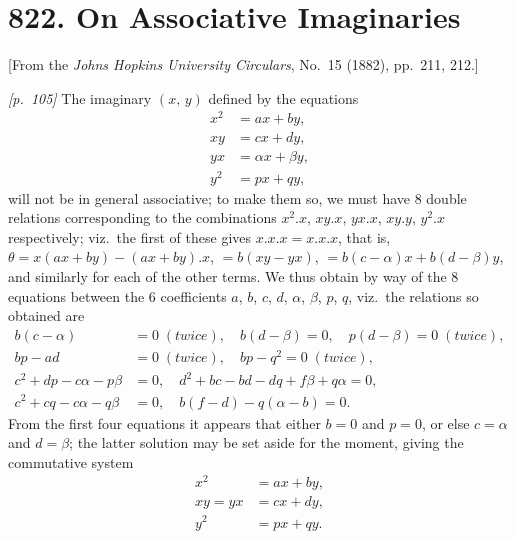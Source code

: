 \documentclass[11pt,a4paper]{article}
\theoremstyle{plain}
\theoremstyle{definition}
\theoremstyle{remark}
\begin{document}
\section*{822. On Associative Imaginaries}

\begin{center}
\small[From the \textit{Johns Hopkins University Circulars}, No.~15 (1882), pp.~211, 212.]
\end{center}

\bigskip

\noindent\textit{[p.~105]} The imaginary $(x,\,y)$ defined by the equations
\begin{align*}
x^2 &= ax + by,\\
xy &= cx + dy,\\
yx &= \alpha x + \beta y,\\
y^2 &= px + qy,
\end{align*}
will not be in general associative; to make them so, we must have 8 double relations corresponding to the combinations $x^2.x$, $xy.x$, $yx.x$, $xy.y$, $y^2.x$ respectively; viz.\ the first of these gives $x.x.x = x.x.x$, that is, $\theta = x(ax + by) - (ax + by).x$, $= b(xy - yx)$, $= b(c - \alpha) x + b(d - \beta) y$, and similarly for each of the other terms. We thus obtain by way of the 8 equations between the 6 coefficients $a$, $b$, $c$, $d$, $\alpha$, $\beta$, $p$, $q$, viz.\ the relations so obtained are
\begin{align*}
b(c - \alpha) &= 0\;(twice),\quad b(d - \beta) = 0,\quad p(d - \beta) = 0\;(twice),\\
bp - ad &= 0\;(twice),\quad bp - q^2 = 0\;(twice),\\
c^2 + dp - c\alpha - p\beta &= 0,\quad d^2 + bc - bd - dq + f\beta + q\alpha = 0,\\
c^2 + cq - c\alpha - q\beta &= 0,\quad b(f - d) - q(\alpha - b) = 0.
\end{align*}
From the first four equations it appears that either $b = 0$ and $p = 0$, or else $c = \alpha$ and $d = \beta$; the latter solution may be set aside for the moment, giving the commutative system
\begin{align*}
x^2 &= ax + by,\\
xy = yx &= cx + dy,\\
y^2 &= px + qy.
\end{align*}
\end{document}
